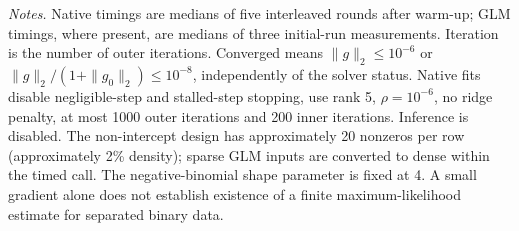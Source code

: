 \noindent\textit{Notes.} Native timings are medians of five interleaved rounds after warm-up; GLM timings, where present, are medians of three initial-run measurements. Iteration is the number of outer iterations. Converged means $\|g\|_2\leq10^{-6}$ or $\|g\|_2/(1+\|g_0\|_2)\leq10^{-8}$, independently of the solver status. Native fits disable negligible-step and stalled-step stopping, use rank 5, $\rho=10^{-6}$, no ridge penalty, at most 1000 outer iterations and 200 inner iterations. Inference is disabled.
The non-intercept design has approximately 20 nonzeros per row (approximately 2\% density); sparse GLM inputs are converted to dense within the timed call.
The negative-binomial shape parameter is fixed at 4. A small gradient alone does not establish existence of a finite maximum-likelihood estimate for separated binary data.
\par
\endgroup
